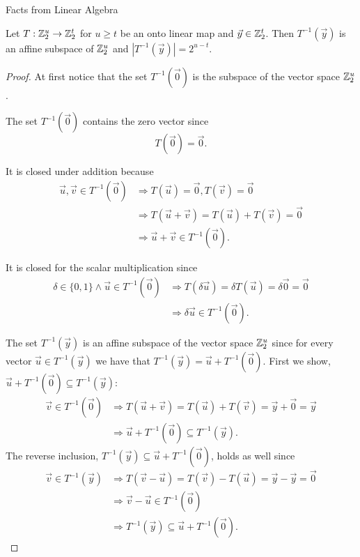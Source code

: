 \begin{chapter}{Facts from Linear Algebra}
\begin{lemma}
\label{lemma-linear-transformation-domain-distribution}
Let $T: \mathbb{Z}_{2}^{u} \rightarrow \mathbb{Z}_{2}^{t}$ for $u \geq t$ be an onto linear map and $\vec{y} \in \mathbb{Z}_{2}^{t}$. Then $T^{-1}(\vec{y})$ is an affine subspace of $\mathbb{Z}_{2}^{u}$ and $|T^{-1}(\vec{y})| = 2 ^ {u - t}$.
\end{lemma}
\begin{proof}
At first notice that the set $T^{-1}(\vec{0})$ is the subspace of the vector space $\mathbb{Z}_{2}^{u}$.

The set $T^{-1}(\vec{0})$ contains the zero vector since
\[ 
	T(\vec{0}) = \vec{0} \text{.} 
\]

It is closed under addition because
\[
\begin{split}
\vec{u}, \vec{v} \in T^{-1}(\vec{0}) 
	& \Rightarrow T(\vec{u}) = \vec{0}, T(\vec{v}) = \vec{0} \\ 
	& \Rightarrow T(\vec{u} + \vec{v}) = T(\vec{u}) + T(\vec{v}) = \vec{0} \\ 
	& \Rightarrow \vec{u} + \vec{v} \in T^{-1}(\vec{0}) \text{.}
\end{split}
\]

It is closed for the scalar multiplication since
\[
\begin{split}
\delta \in \{0, 1\} \wedge \vec{u} \in T^{-1}(\vec{0}) 
	& \Rightarrow T(\delta \vec{u}) = \delta T(\vec{u}) = \delta \vec{0} = \vec{0} \\
	& \Rightarrow \delta \vec{u} \in T^{-1}(\vec{0}) \text{.}
\end{split}
\]

The set $T^{-1}(\vec{y})$ is an affine subspace of the vector space $\mathbb{Z}_{2}^{u}$ since for every vector $\vec{u} \in T^{-1}(\vec{y})$ we have that $T^{-1}(\vec{y}) = \vec{u} + T^{-1}(\vec{0})$. First we show, $\vec{u} + T^{-1}(\vec{0}) \subseteq T^{-1}(\vec{y})$:
\[
\begin{split}
\vec{v} \in T^{-1}(\vec{0}) 
	& \Rightarrow T(\vec{u} + \vec{v}) = T(\vec{u}) + T(\vec{v}) = \vec{y} + \vec{0} = \vec{y}  \\
	& \Rightarrow \vec{u} + T^{-1}(\vec{0}) \subseteq T^{-1}(\vec{y}) \text{.}
\end{split}
\]
The reverse inclusion, $T^{-1}(\vec{y}) \subseteq \vec{u} + T^{-1}(\vec{0})$, holds as well since
\[
\begin{split}
\vec{v} \in T^{-1}(\vec{y}) 
	& \Rightarrow T(\vec{v} - \vec{u}) = T(\vec{v}) - T(\vec{u}) = \vec{y} - \vec{y} = \vec{0} \\
	& \Rightarrow \vec{v} - \vec{u} \in T^{-1}(\vec{0}) \\
	& \Rightarrow T^{-1}(\vec{y}) \subseteq \vec{u} + T^{-1}(\vec{0}) \text{.}
\end{split}
\]


\end{proof}
\end{chapter}
